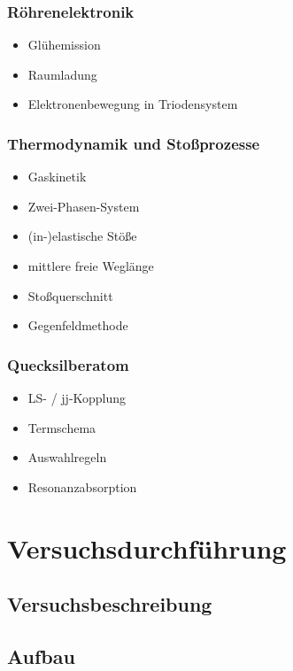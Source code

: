 \documentclass[11pt, a4paper]{article}
\begin{document}
\subsubsection{Röhrenelektronik}

\begin{itemize}
\item Glühemission
\item Raumladung
\item Elektronenbewegung in Triodensystem
\end{itemize}

\subsubsection{Thermodynamik und Stoßprozesse}

\begin{itemize}
\item Gaskinetik
\item Zwei-Phasen-System
\item (in-)elastische Stöße
\item mittlere freie Weglänge
\item Stoßquerschnitt
\item Gegenfeldmethode
\end{itemize}

\subsubsection{Quecksilberatom}

\begin{itemize}
\item LS- / jj-Kopplung
\item Termschema
\item Auswahlregeln
\item Resonanzabsorption
\end{itemize}

\section{Versuchsdurchführung}

\subsection{Versuchsbeschreibung}

\subsection{Aufbau}
\end{document}
